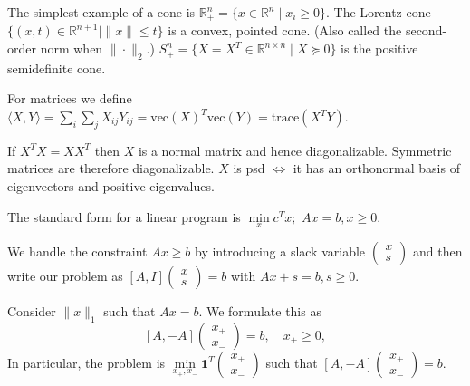\documentclass[english, 11pt]{article}
\begin{document}
\begin{exmp}
The simplest example of a cone is $\mathbb{R}^n_+ = \{x \in \mathbb{R}^n \mid x_i \ge 0 \}$.
The Lorentz cone $\{(x,t) \in \mathbb{R}^{n+1} \mid \|x\| \le t \}$ is a convex, pointed cone. (Also called the second-order norm when $\|\cdot\|_2$.) $S^n_+ = \{ X = X^T \in \mathbb{R}^{n \times n} \mid X \succeq 0 \}$ is the positive semidefinite cone.
\end{exmp}

\begin{rem}
For matrices we define $\langle X,Y \rangle = \sum_i \sum_j X_{ij} Y_{ij} = \text{vec}(X)^T \text{vec}(Y) = \text{trace}(X^T Y)$.
\end{rem}

\begin{rem}
If $X^T X = X X^T$ then $X$ is a normal matrix and hence diagonalizable. Symmetric matrices are therefore diagonalizable. $X$ is psd $\iff$ it has an orthonormal basis of eigenvectors and positive eigenvalues.
\end{rem}

\begin{defn}
The standard form for a linear program is $\min \limits_x c^T x;$ $Ax=b, x \ge 0$.
\end{defn}


\begin{rem}
We handle the constraint $Ax \ge b$ by introducing a slack variable $\begin{pmatrix} x \\ s \end{pmatrix}$ and then write our problem as $[A,I] \begin{pmatrix} x\\ s \end{pmatrix} = b$ with $Ax + s =b, s \ge 0$.
\end{rem}


\begin{exmp}
Consider $\|x\|_1$ such that $Ax=b$. We formulate this as
\[
[A, -A] \begin{pmatrix} x_+ \\ x_- \end{pmatrix} = b, \quad x_+ \ge 0, 
\]
In particular, the problem is $\min \limits_{x_+, x_-} \mathbf{1}^T \begin{pmatrix} x_+ \\ x_- \end{pmatrix}$ such that $[A, -A] \begin{pmatrix} x_+ \\ x_- \end{pmatrix} = b$.
\end{exmp}
\end{document}
